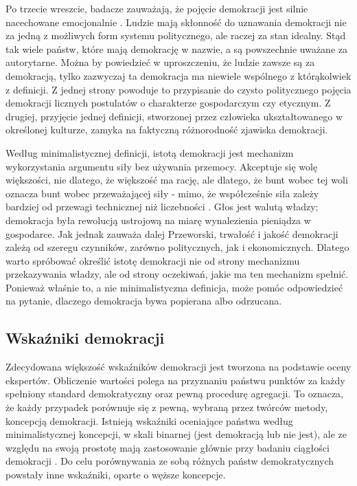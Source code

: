\documentclass[12pt]{article}
\begin{document}
Po trzecie wreszcie, badacze zauważają, że pojęcie demokracji jest silnie nacechowane emocjonalnie \citep{JaskoKoss}. Ludzie mają skłonność do uznawania demokracji nie za jedną z możliwych form systemu politycznego, ale raczej za stan idealny. Stąd tak wiele państw, które mają demokrację w nazwie, a są powszechnie uważane za autorytarne. Można by powiedzieć w uproszczeniu, że ludzie zawsze są za demokracją, tylko zazwyczaj ta demokracja ma niewiele wspólnego z którąkolwiek z definicji. Z jednej strony powoduje to przypisanie do czysto politycznego pojęcia demokracji licznych postulatów o charakterze gospodarczym czy etycznym. Z drugiej, przyjęcie jednej definicji, stworzonej przez człowieka ukształtowanego w określonej kulturze, zamyka na faktyczną różnorodność zjawiska demokracji.

Według minimalistycznej definicji, istotą demokracji jest mechanizm wykorzystania argumentu siły bez używania przemocy. Akceptuje się wolę większości, nie dlatego, że większość ma rację, ale dlatego, że bunt wobec tej woli oznacza bunt wobec przeważającej siły - mimo, że współcześnie siła zależy bardziej od przewagi technicznej niż liczebności \citep{Przeworski}. Głos jest walutą władzy; demokracja była rewolucją ustrojową na miarę wynalezienia pieniądza w gospodarce. Jak jednak zauważa dalej Przeworski, trwałość i jakość demokracji zależą od szeregu czynników, zarówno politycznych, jak i ekonomicznych. Dlatego warto spróbować określić istotę demokracji nie od strony mechanizmu przekazywania władzy, ale od strony oczekiwań, jakie ma ten mechanizm spełnić. Ponieważ właśnie to, a nie minimalistyczna definicja, może pomóc odpowiedzieć na pytanie, dlaczego demokracja bywa popierana albo odrzucana.

\hypertarget{wskaux17aniki-demokracji}{%
\subsection{Wskaźniki demokracji}\label{wskaux17aniki-demokracji}}

Zdecydowana większość wskaźników demokracji jest tworzona na podstawie oceny ekspertów. Obliczenie wartości polega na przyznaniu państwu punktów za każdy spełniony standard demokratyczny oraz pewną procedurę agregacji. To oznacza, że każdy przypadek porównuje się z pewną, wybraną przez twórców metody, koncepcją demokracji. Istnieją wskaźniki oceniające państwa według minimalistycznej koncepcji, w skali binarnej (jest demokracją lub nie jest), ale ze względu na swoją prostotę mają zastosowanie głównie przy badaniu ciągłości demokracji \citep{Coppedge}. Do celu porównywania ze sobą różnych państw demokratycznych powstały inne wskaźniki, oparte o węższe koncepcje.
\end{document}
